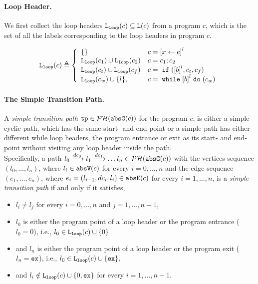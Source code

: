 \paragraph{Loop Header.}
We first collect the loop headers $\mathtt{L}_{\mathtt{loop}}(c) \subseteq \mathtt{L}(c)$ from a program $c$, which is the set of all the labels corresponding to the loop headers in program $c$.
\begin{defn}
  \label{def:loopl}
  \[
  \loopl(c) \triangleq 
  \left\{
    \begin{array}{ll}
      \{\}  & {c} = \clabel{\assign x e}^{l} \\
      \loopl({c_1}) \cup \loopl({{c_2}})  & {c} = {c_1};{c_2} \\
      \loopl(c_t) \cup \loopl({{c_f}})   & {c} =\eif(\clabel{\bexpr}^{l}, c_t, c_f) \\
  \loopl(c_w) \cup \{l\}, &  {c}   = \ewhile \clabel{\bexpr}^{l} \edo (c_w)
  \end{array}
\right.
\]
  \end{defn}

  \paragraph{The Simple Transition Path.}
  \begin{defn}
  \label{def:tpath}
A \emph{simple transition path}
$\mathtt{tp} \in \mathcal{PH}(\mathtt{abs}{\mathtt{G}}(c))$ for the program $c$, is either a simple cyclic path, which has the same start- and end-point
or a simple path has either different while loop headers, the program entrance or exit as its start- and end-point
without visiting any loop header inside the path.
\\
Specifically, a path $l_0 \xrightarrow{dc_0} l_1 \xrightarrow{dc_1} \ldots l_n \in \mathcal{PH}(\mathtt{abs}{\mathtt{G}}(c))$ with the
vertices sequence $(l_0, \ldots, l_n)$, where $l_i \in \mathtt{abs}{\mathtt{V}}(c)$ for every $i = 0, \ldots, n$ and
%
the edge sequence $(e_1, \ldots, e_n)$, where $e_i = (l_{i - 1}, dc_i, l_{i}) \in \mathtt{abs}{\mathtt{E}}(c)$ for every $i = 1, \ldots, n$,
%
is a \emph{simple transition path} if and only if it satisfies,
\begin{itemize}
  \item $l_i \neq l_j$ for every $i = 0, \ldots, n$ and $j = 1, \ldots, {n - 1}$,
  \item $l_0$ is either the program point of a loop header or the program entrance ($l_0 = 0$),
  i.e., $l_0 \in \mathtt{L}_{\mathtt{loop}}(c) \cup \{ 0 \}$
  \item and $l_n$ is either the program point of a loop header or the program exit ($l_n = \mathtt{ex}$),
  i.e., $l_0 \in \mathtt{L}_{\mathtt{loop}}(c) \cup \{ \mathtt{ex} \}$,
  \item and $l_i \notin \mathtt{L}_{\mathtt{loop}}(c) \cup \{ 0, \mathtt{ex} \}$ for every $i = 1, \ldots, n-1$.
\end{itemize}
\end{defn}

